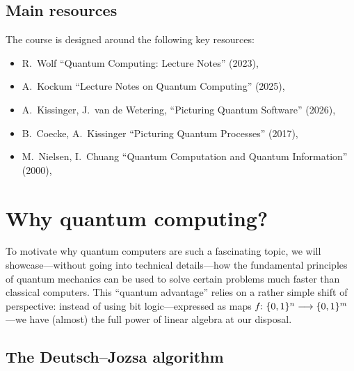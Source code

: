 \documentclass[a4paper, oneside, 12pt]{amsart}
\begin{document}
\subsection*{Main resources}\label{sec:main-resources}
The course is designed around the following key resources:

\begin{itemize}[leftmargin=*]
  \item  R.\ Wolf ``Quantum Computing: Lecture Notes'' (2023), \cite{wolf2023:QuantumComputing}
  \item A.\ Kockum \etal ``Lecture Notes on Quantum Computing'' (2025), \cite{kockum-soro-garcía-álvarez-et-al2025:Lecture}
  \item A.\ Kissinger, J.\ van de Wetering, ``Picturing Quantum Software'' (2026), \cite{kissinger-wetering2025:PicturingQuantumSoftware}
  \item B.\ Coecke, A.\ Kissinger ``Picturing Quantum Processes'' (2017), \cite{coecke-kissinger2017:PicturingQuantumProcesses}
  \item M.\ Nielsen, I.\ Chuang ``Quantum Computation and Quantum Information'' (2000), \cite{nielsen-chuang2000:QuantumComputationInformation}
\end{itemize}


\cleardoublepage

\section{Why quantum computing?}\label{sec:why-quantum-computing}

To motivate why quantum computers are such a fascinating topic, we will showcase---without going into technical details---how the fundamental principles of quantum mechanics can be used to solve certain problems much faster than classical computers.
This ``quantum advantage'' relies on a rather simple shift of perspective: instead of using bit logic---expressed as maps \(f\from \{0,1\}^{n}\to\{0,1\}^{m}\)---we have (almost) the full power of linear algebra at our disposal.

\subsection*{The Deutsch--Jozsa algorithm}\label{sec:the-deutsch--josza-algorithm}
\end{document}
